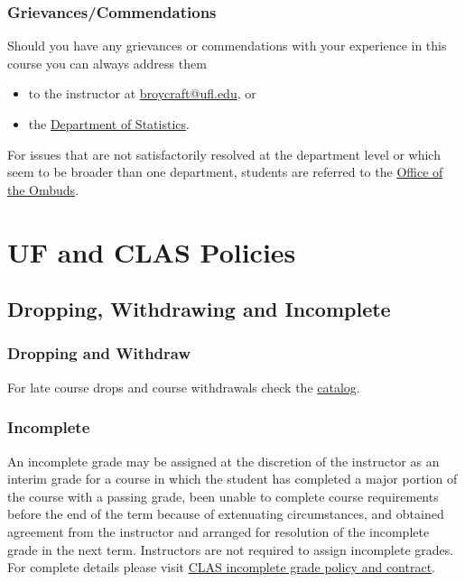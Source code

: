 \documentclass[11pt]{article}
\begin{document}
\subsubsection*{Grievances/Commendations}
Should you have any grievances or commendations with your experience in this course you can always address them
\begin{itemize}
	\item to the instructor at \href{mailto:broycraft@ufl.edu}{broycraft@ufl.edu}, or 
	\item the \href{https://stat.ufl.edu}{Department of Statistics}.
\end{itemize}
For issues that are not satisfactorily resolved at the department level or which seem to be broader than one department, students are referred to the \href{https://ombuds.ufl.edu}{Office of the Ombuds}.

\pagebreak

\section*{UF and CLAS Policies}
\subsection*{Dropping, Withdrawing and Incomplete}
\subsubsection*{Dropping and Withdraw}
For late course drops and course withdrawals check the \href{https://catalog.ufl.edu/UGRD/academic-regulations/dropping-courses-withdrawals}{catalog}.

\subsubsection*{Incomplete}
An incomplete grade may be assigned at the discretion of the instructor as an interim grade for a course in which the student has completed a major portion of the course with a passing grade, been unable to complete course requirements before the end of the term because of extenuating circumstances, and obtained agreement from the instructor and arranged for resolution of the incomplete grade in the next term. Instructors are not required to assign incomplete grades.  For complete details please visit \href{https://www.advising.ufl.edu/academicinfo/clas-policiesprocedures/incomplete-grades}{CLAS incomplete grade policy and contract}.
\end{document}
